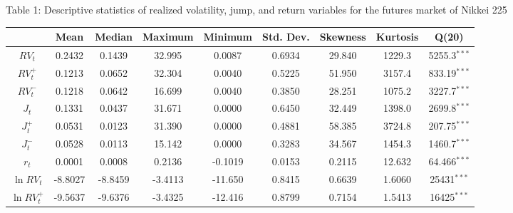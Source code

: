 \documentclass[10pt]{article}
\begin{document}
\newpage
\fontsize{11pt}{15pt}\selectfont
\begin{landscape}
\begin{center}
Table 1: Descriptive statistics of realized volatility, jump, and return variables for the futures market of Nikkei 225
\end{center}

\begin{center}
\begin{tabular}{ccccccccc} \hline       
                           &Mean          &Median     &Maximum     & Minimum    &Std. Dev.            &Skewness        &Kurtosis        & Q(20)                                      \\ \hline 
$RV_t$                  &0.2432         &0.1439     &32.995         &0.0087       &0.6934               &29.840            &1229.3          & 5255.3$^{\ast \ast \ast}$           \\
$RV_t^{+}$              &0.1213         &0.0652     &32.304         &0.0040       &0.5225               &51.950            &3157.4          & 833.19$^{\ast \ast \ast}$            \\
$RV_t^{-}$              &0.1218         &0.0642     &16.699         &0.0040       &0.3850               &28.251            &1075.2          & 3227.7$^{\ast \ast \ast}$           \\
$J_t$                    &0.1331         &0.0437     &31.671         &0.0000        &0.6450               &32.449            &1398.0          & 2699.8$^{\ast \ast \ast}$           \\
$J_t^{+}$                &0.0531         &0.0123     &31.390         &0.0000        &0.4881               &58.385            &3724.8          & 207.75$^{\ast \ast \ast}$            \\
$J_t^{-}$               &0.0528          &0.0113     &15.142         &0.0000        &0.3283               &34.567           &1454.3            & 1460.7$^{\ast \ast \ast}$            \\
$r_t$                     &0.0001         &0.0008     &0.2136         &-0.1019     &0.0153               &0.2115            &12.632           & 64.466$^{\ast \ast \ast}$            \\
$\ln RV_t$             &-8.8027       &-8.8459    &-3.4113       &-11.650      &0.8415               &0.6639            &1.6060         &  25431$^{\ast \ast \ast}$             \\
$\ln RV_t^{+}$         &-9.5637       &-9.6376   &-3.4325        &-12.416     &0.8799               &0.7154            &1.5413          &  16425$^{\ast \ast \ast}$             \\

\end{tabular}
\end{center}
\end{landscape}
\end{document}
